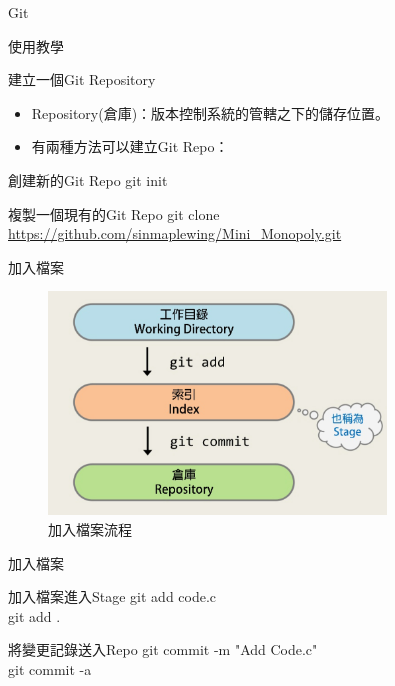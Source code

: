 \documentclass[pdf,16pt]{beamer}
\begin{document}
\begin{section}{Git}
\begin{subsection}{使用教學}
      \begin{frame}{建立一個Git Repository}
        \begin{itemize}
          \item Repository(倉庫)：版本控制系統的管轄之下的儲存位置。
          \item 有兩種方法可以建立Git Repo：
        \end{itemize}
        \begin{block}{創建新的Git Repo}
          git init
        \end{block}
        \begin{block}{複製一個現有的Git Repo}
          git clone \url{https://github.com/sinmaplewing/Mini_Monopoly.git}
        \end{block}
      \end{frame}
      
      \begin{frame}{加入檔案}
        \begin{figure}[h!]
          \includegraphics[width=0.8\textwidth]{images/004.jpg} 
          \caption{加入檔案流程}
        \end{figure}
      \end{frame}
      
      \begin{frame}{加入檔案}
        \begin{block}{加入檔案進入Stage}
          git add code.c\\
          git add .
        \end{block}
        \begin{block}{將變更記錄送入Repo}
          git commit -m "Add Code.c"\\
          git commit -a
        \end{block}
      \end{frame}
      

\end{subsection}
\end{section}
\end{document}
